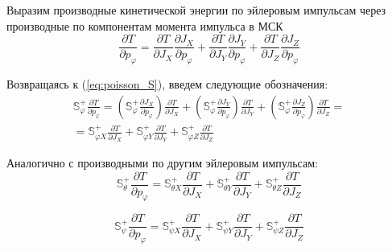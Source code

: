 Выразим производные кинетической энергии по эйлеровым импульсам через производные по компонентам момента импульса в МСК
\[
\frac{\partial T}{\partial p_{\varphi}} = \frac{\partial T}{\partial J_X}\frac{\partial J_X}{\partial p_{\varphi}} + 
\frac{\partial T}{\partial J_Y}\frac{\partial J_Y}{\partial p_{\varphi}} + 
\frac{\partial T}{\partial J_Z}\frac{\partial J_Z}{\partial p_{\varphi}}
\]

Возвращаясь к (\ref{eq:poisson_S}), введем следующие обозначения:
\begin{equation}
\label{eq:S_phi}
\begin{aligned}
\mathbb{S}^{+}_{\varphi}\frac{\partial T}{\partial p_{\varphi}} =
\left(\mathbb{S}^{+}_{\varphi}\frac{\partial J_X}{\partial p_{\varphi}}\right) \frac{\partial T}{\partial J_X} +
\left(\mathbb{S}^{+}_{\varphi}\frac{\partial J_Y}{\partial p_{\varphi}}\right) \frac{\partial T}{\partial J_Y} +
\left(\mathbb{S}^{+}_{\varphi}\frac{\partial J_Z}{\partial p_{\varphi}}\right) \frac{\partial T}{\partial J_Z}  = \\
 = \mathbb{S}^{+}_{\varphi X} \frac{\partial T}{\partial J_X} +
\mathbb{S}^{+}_{\varphi Y} \frac{\partial T}{\partial J_Y} +
\mathbb{S}^{+}_{\varphi Z} \frac{\partial T}{\partial J_Z}
\end{aligned}
\end{equation}

Аналогично с производными по другим эйлеровым импульсам:
\begin{equation}
\mathbb{S}^{+}_{\theta}\frac{\partial T}{\partial p_{\varphi}} =
\mathbb{S}^{+}_{\theta X} \frac{\partial T}{\partial J_X} +
\mathbb{S}^{+}_{\theta Y} \frac{\partial T}{\partial J_Y} +
\mathbb{S}^{+}_{\theta Z} \frac{\partial T}{\partial J_Z}
\end{equation}

\begin{equation}
\label{eq:S_psi}
\mathbb{S}^{+}_{\psi}\frac{\partial T}{\partial p_{\varphi}} =
\mathbb{S}^{+}_{\psi X} \frac{\partial T}{\partial J_X} +
\mathbb{S}^{+}_{\psi Y} \frac{\partial T}{\partial J_Y} +
\mathbb{S}^{+}_{\psi Z} \frac{\partial T}{\partial J_Z}
\end{equation}

